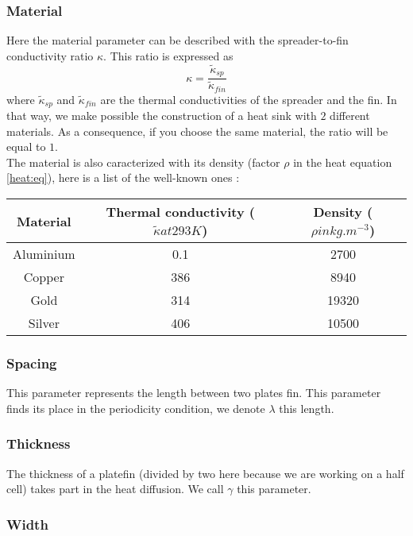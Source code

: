 \subsubsection{Material}

Here the material parameter can be described with the spreader-to-fin conductivity ratio $\kappa$. This ratio is expressed as
\begin{equation*}
\displaystyle{\kappa = \frac{\tilde{\kappa}_{sp}}{\tilde{\kappa}_{fin}}}
\end{equation*}
where $\tilde{\kappa}_{sp}$ and $\tilde{\kappa}_{fin}$ are the thermal conductivities of the spreader and the fin. In that way, we make possible the construction of a heat sink with $2$ different materials. As a consequence, if you choose the same material, the ratio will be equal to $1$. \\

\noindent The material is also caracterized with its density (factor $\rho$ in the heat equation \ref{heat:eq}), here is a list of the well-known ones :
\begin{center}
\begin{tabular}{|c|c|c|}
  \hline
  Material & Thermal conductivity ($\tilde{\kappa} at 293 K$) & Density ($\rho in kg.m^{-3}$) \\
  \hline
  \hline
  Aluminium & 0.1 & 2700 \\
  \hline
  Copper & 386 & 8940 \\
  \hline
  Gold & 314 & 19320 \\
  \hline
  Silver & 406 & 10500 \\
  \hline
\end{tabular}
\end{center}

\subsubsection{Spacing}
This parameter represents the length between two plates fin. This parameter finds its place in the periodicity condition, we denote $\lambda$ this length.

\subsubsection{Thickness}
The thickness of a platefin (divided by two here because we are working on a half cell) takes part in the heat diffusion. We call $\gamma$ this parameter.

\subsubsection{Width}

